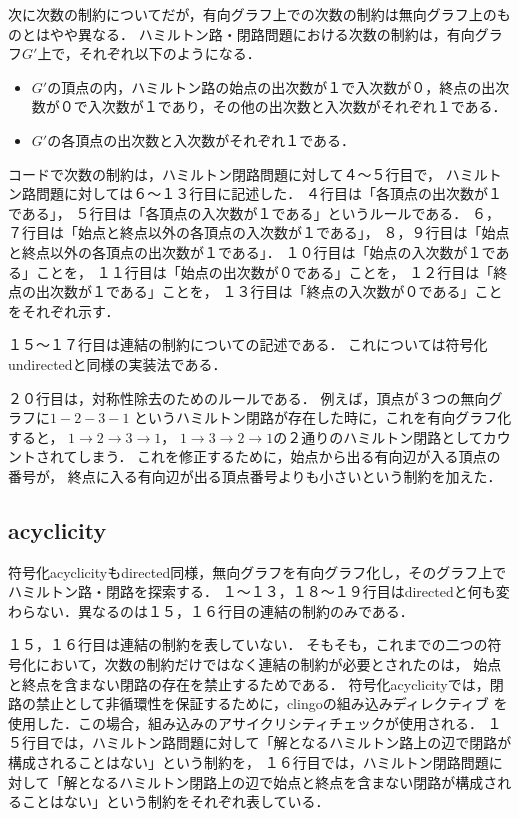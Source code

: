 次に次数の制約についてだが，有向グラフ上での次数の制約は無向グラフ上のものとはやや異なる．
ハミルトン路・閉路問題における次数の制約は，有向グラフ$G'$上で，それぞれ以下のようになる．
\begin{itemize}
\item $G'$の頂点の内，ハミルトン路の始点の出次数が１で入次数が０，終点の出次数が０で入次数が１であり，その他の出次数と入次数がそれぞれ１である．
\item $G'$の各頂点の出次数と入次数がそれぞれ１である．
\end{itemize}
コードで次数の制約は，ハミルトン閉路問題に対して４〜５行目で，
ハミルトン路問題に対しては６〜１３行目に記述した．
４行目は「各頂点の出次数が１である」，
５行目は「各頂点の入次数が１である」というルールである．
６，７行目は「始点と終点以外の各頂点の入次数が１である」，
８，９行目は「始点と終点以外の各頂点の出次数が１である」．
１０行目は「始点の入次数が１である」ことを，
１１行目は「始点の出次数が０である」ことを，
１２行目は「終点の出次数が１である」ことを，
１３行目は「終点の入次数が０である」ことをそれぞれ示す．

１５〜１７行目は連結の制約についての記述である．
これについては符号化undirectedと同様の実装法である．

２０行目は，対称性除去のためのルールである．
例えば，頂点が３つの無向グラフに$1 - 2 - 3 - 1$
というハミルトン閉路が存在した時に，これを有向グラフ化すると，
$1 \rightarrow 2 \rightarrow 3 \rightarrow 1$，
$1 \rightarrow 3 \rightarrow 2 \rightarrow 1$の２通りのハミルトン閉路としてカウントされてしまう．
これを修正するために，始点から出る有向辺が入る頂点の番号が，
終点に入る有向辺が出る頂点番号よりも小さいという制約を加えた．
\newpage
\subsection{acyclicity}

符号化acyclicityもdirected同様，無向グラフを有向グラフ化し，そのグラフ上でハミルトン路・閉路を探索する．
１〜１３，１８〜１９行目はdirectedと何も変わらない．異なるのは１５，１６行目の連結の制約のみである．

１５，１６行目は連結の制約を表していない．
そもそも，これまでの二つの符号化において，次数の制約だけではなく連結の制約が必要とされたのは，
始点と終点を含まない閉路の存在を禁止するためである．
符号化acyclicityでは，閉路の禁止として非循環性を保証するために，clingoの組み込みディレクティブ\cite{gebser2016}
を使用した．この場合，組み込みのアサイクリシティチェック\cite{bomanson2016}が使用される．\cite{dimopoulos2018}
１５行目では，ハミルトン路問題に対して「解となるハミルトン路上の辺で閉路が構成されることはない」という制約を，
１６行目では，ハミルトン閉路問題に対して「解となるハミルトン閉路上の辺で始点と終点を含まない閉路が構成されることはない」という制約をそれぞれ表している．
